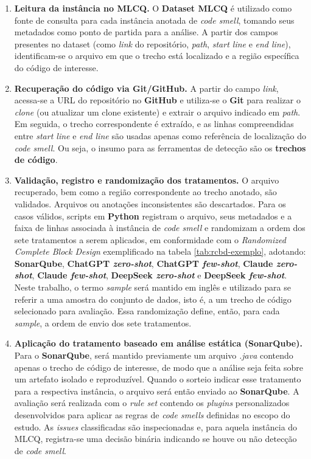 \begin{enumerate}
    \item \textbf{Leitura da instância no MLCQ.} 
    O \textbf{Dataset MLCQ} é utilizado como fonte de consulta para cada instância anotada de \textit{code smell}, tomando seus metadados como ponto de partida para a análise. A partir dos campos presentes no dataset (como \textit{link} do repositório, \textit{path}, \textit{start line} e \textit{end line}), identificam-se o arquivo em que o trecho está localizado e a região específica do código de interesse.

    \item \textbf{Recuperação do código via Git/GitHub.}
    A partir do campo \textit{link}, acessa-se a URL do repositório no \textbf{GitHub} e utiliza-se o \textbf{Git} para 
    realizar o \textit{clone} (ou atualizar um clone existente) e extrair o arquivo indicado em \textit{path}. Em seguida, o trecho correspondente é extraído, e as linhas compreendidas entre \textit{start line} e \textit{end line} são usadas apenas como referência de localização do \textit{code smell}. Ou seja, o insumo para as ferramentas de detecção são os \textbf{trechos de código}.

    \item \textbf{Validação, registro e randomização dos tratamentos.}
    O arquivo recuperado, bem como a região correspondente ao trecho anotado, são validados. Arquivos ou anotações inconsistentes são descartados. Para os casos válidos, scripts em \textbf{Python} registram o arquivo, seus metadados e a faixa de linhas associada à instância de \textit{code smell} e randomizam a ordem dos sete tratamentos a serem aplicados, em conformidade com o \textit{Randomized Complete Block Design} exemplificado na tabela \ref{tab:rcbd-exemplo}, adotando: \textbf{SonarQube}, \textbf{ChatGPT \textit{zero-shot}}, \textbf{ChatGPT \textit{few-shot}}, \textbf{Claude \textit{zero-shot}}, \textbf{Claude \textit{few-shot}}, \textbf{DeepSeek \textit{zero-shot}} e \textbf{DeepSeek \textit{few-shot}}. 
    Neste trabalho, o termo \textit{sample} será mantido em inglês e utilizado para se referir a uma amostra do conjunto de dados, isto é, a um trecho de código selecionado para avaliação. Essa randomização define, então, para cada \textit{sample}, a ordem de envio dos sete tratamentos.

    \item \textbf{Aplicação do tratamento baseado em análise estática (SonarQube).}
    Para o \textbf{SonarQube}, será mantido previamente um arquivo \textit{.java} contendo apenas o trecho de código de interesse, de modo que a análise seja feita sobre um artefato isolado e reproduzível. Quando o sorteio indicar esse tratamento para a respectiva instância, o arquivo será então enviado ao \textbf{SonarQube}. A avaliação será realizada com o \textit{rule set} contendo os \textit{plugins} personalizados desenvolvidos para aplicar as regras de \textit{code smells} definidas no escopo do estudo. As \textit{issues} 
    classificadas são inspecionadas e, para aquela instância do MLCQ, registra-se uma decisão binária indicando se houve ou não detecção de \textit{code smell}.


\end{enumerate}
